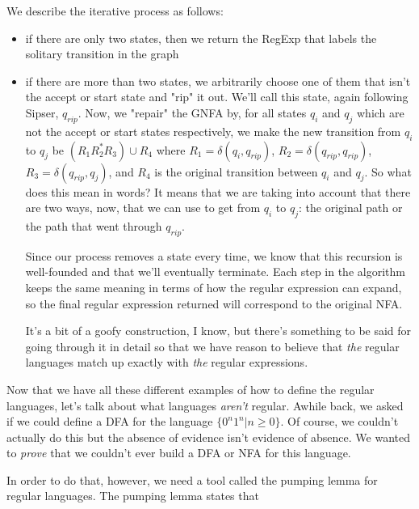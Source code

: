 \documentclass[11pt]{article}
\begin{document}
We describe the iterative process as follows: 

\begin{itemize}
\item if there are only two states, then we return the RegExp that labels the solitary transition in the graph
\item if there are more than two states, we arbitrarily choose one of them that isn't the accept or start state and "rip" it out. We'll call this state, again following Sipser, $q_{rip}$. Now, we "repair" the GNFA by, for all states $q_i$ and $q_j$ which are not the accept or start states respectively, we make the new transition from $q_i$ to $q_j$ be $(R_1 R_2^* R_3) \cup R_4$ where $R_1 = \delta(q_i,q_{rip})$, $R_2 = \delta(q_{rip},q_{rip})$, $R_3 = \delta(q_{rip},q_j)$, and $R_4$ is the original transition between $q_i$ and $q_j$. So what does this mean in words? It means that we are taking into account that there are two ways, now, that we can use to get from $q_i$ to $q_j$: the original path or the path that went through $q_{rip}$. 

Since our process removes a state every time, we know that this recursion is well-founded and that we'll eventually terminate. Each step in the algorithm keeps the same meaning in terms of how the regular expression can expand, so the final regular expression returned will correspond to the original NFA.

It's a bit of a goofy construction, I know, but there's something to be said for going through it in detail so that we have reason to believe that \emph{the} regular languages match up exactly with \emph{the} regular expressions.
\end{itemize}

Now that we have all these different examples of how to define the regular languages, let's talk about what languages \emph{aren't} regular. Awhile back, we asked if we could define a DFA for the language $\{0^n1^n | n \geq 0\}$. Of course, we couldn't actually do this but the absence of evidence isn't evidence of absence. We wanted to \emph{prove} that we couldn't ever build a DFA or NFA for this language.

In order to do that, however, we need a tool called the pumping lemma for regular languages. The pumping lemma states that 
\end{document}
